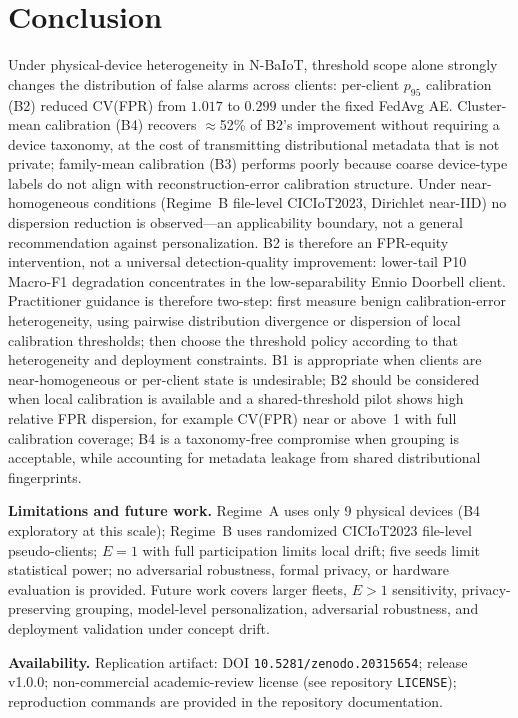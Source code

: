 \section{Conclusion}
\label{sec:conclusion}

Under physical-device heterogeneity in N-BaIoT, threshold scope alone strongly changes
the distribution of false alarms across clients: per-client $p_{95}$ calibration (B2)
reduced CV(FPR) from $1.017$ to $0.299$ under the fixed FedAvg AE.
Cluster-mean calibration (B4) recovers $\approx$52\% of B2's improvement without
requiring a device taxonomy, at the cost of transmitting distributional metadata that
is not private; family-mean calibration (B3) performs poorly because coarse device-type
labels do not align with reconstruction-error calibration structure.
Under near-homogeneous conditions (Regime~B file-level CICIoT2023, Dirichlet near-IID)
no dispersion reduction is observed---an applicability boundary, not a general
recommendation against personalization.
B2 is therefore an FPR-equity intervention, not a universal detection-quality improvement:
lower-tail P10 Macro-F1 degradation concentrates in the low-separability Ennio Doorbell
client. Practitioner guidance is therefore two-step: first measure benign calibration-error heterogeneity, using pairwise distribution divergence or dispersion of local calibration thresholds; then choose the threshold policy according to that heterogeneity and deployment constraints. B1 is appropriate when clients are near-homogeneous or per-client state is undesirable; B2 should be considered when local calibration is available and a shared-threshold pilot shows high relative FPR dispersion, for example CV(FPR) near or above~1 with full calibration coverage; B4 is a taxonomy-free compromise when grouping is acceptable, while accounting for metadata leakage from shared distributional fingerprints.

\textbf{Limitations and future work.}
Regime~A uses only 9 physical devices (B4 exploratory at this scale);
Regime~B uses randomized CICIoT2023 file-level pseudo-clients;
$E{=}1$ with full participation limits local drift; five seeds limit statistical power;
no adversarial robustness, formal privacy, or hardware evaluation is provided.
Future work covers larger fleets, $E>1$ sensitivity, privacy-preserving grouping,
model-level personalization, adversarial robustness, and deployment validation under
concept drift.

\textbf{Availability.}
Replication artifact: DOI \nolinkurl{10.5281/zenodo.20315654}; release v1.0.0; non-commercial academic-review license (see repository \texttt{LICENSE}); reproduction commands are provided in the repository documentation.
